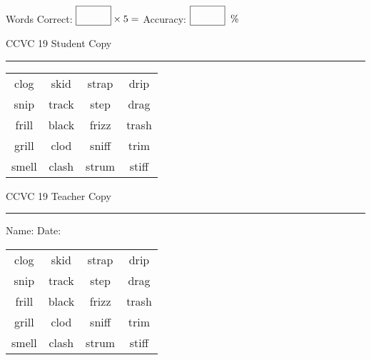 \documentclass{memoir}
\begin{document}
\normalsize

Words Correct: $\fbox{\phantom{\huge 100}} \times 5 = $ Accuracy: $\fbox{\phantom{\huge 100}}\;\; \%$ 

\vfill

\newpage


\footnotesize \noindent
CCVC 19 \hfill Student Copy
\smallskip
\hrule

\Large

\setlength{\tabcolsep}{14pt}
\def\arraystretch{3}

{\selectfont


\begin{vplace}[0.5]
\begin{center}
\begin{tabular}{cccc}
clog & skid & strap & drip \\
snip & track       & step & drag        \\
frill & black            & frizz & trash \\
grill            & clod & sniff & trim \\
smell & clash            & strum & stiff \\
\end{tabular}
\end{center}
\end{vplace}

}

\newpage

\footnotesize \noindent
CCVC 19 \hfill Teacher Copy
\smallskip
\hrule

\normalsize

\vfill

\noindent
Name: \underline{\hspace{1.75in}} \hfill Date: \underline{\hspace{1in}}

\Large

{\selectfont


\begin{vplace}[0.5]
\begin{center}
\begin{tabular}{cccc}
clog & skid & strap & drip \\
snip & track       & step & drag        \\
frill & black            & frizz & trash \\
grill            & clod & sniff & trim \\
smell & clash            & strum & stiff \\
\end{tabular}
\end{center}
\end{vplace}



}
\end{document}
